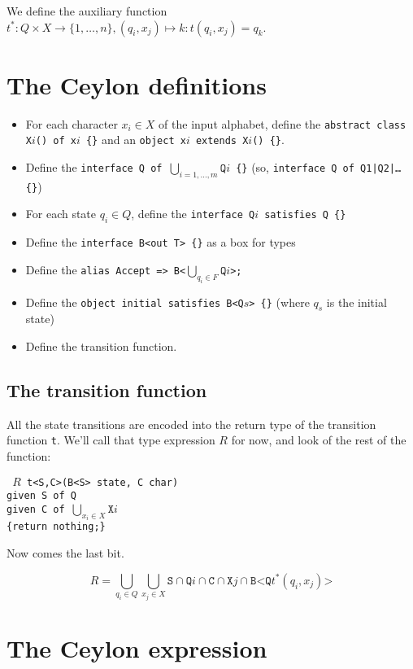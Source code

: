 \documentclass[a4paper, 11pt]{article}
\newcommand{\code}[1]{\texttt{#1}}
\theoremstyle{definition}
\begin{document}
We define the auxiliary function $t^\ast: Q\times X\to\{1,\ldots,n\}, (q_i, x_j) \mapsto k: t(q_i, x_j) = q_k$.

\section{The Ceylon definitions}

\begin{itemize}
\item For each character $x_i\in X$ of the input alphabet, define the \code{abstract class X$i$() of x$i$ \{\}} and an \code{object x$i$ extends X$i$() \{\}}.
\item Define the \code{interface Q of $\bigcup\limits_{i=1,\ldots,m}{\code{Q}i}$ \{\}} (so, \code{interface Q of Q1|Q2|\ldots \{\}})
\item For each state $q_i\in Q$, define the \code{interface Q$i$ satisfies Q \{\}}
\item Define the \code{interface B<out T> \{\}} as a box for types
\item Define the \code{alias Accept => B<$\bigcup\limits_{q_i\in F}\code{Q}i$>;}
\item Define the \code{object initial satisfies B<Q$s$> \{\}} (where $q_s$ is the initial state)
\item Define the transition function.
\end{itemize}

\subsection{The transition function}

All the state transitions are encoded into the return type of the transition function \code{t}.
We’ll call that type expression $R$ for now, and look of the rest of the function:

\code{
$R$ t<S,C>(B<S> state, C char)\\
given S of Q\\
given C of $\bigcup\limits_{x_i\in X}\code{X}i$\\
\{return nothing;\}
}

Now comes the last bit.

\[
R = \bigcup\limits_{q_i\in Q}\bigcup\limits_{x_j\in X} \code{S}\cap\code{Q}i \cap \code{C}\cap\code{X}j \cap \code{B<Q}t^\ast(q_i, x_j)\code{>}
\]

\section{The Ceylon expression}
\end{document}
